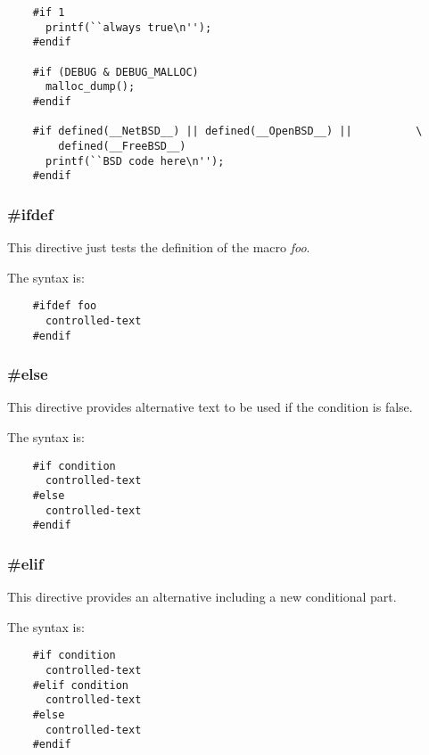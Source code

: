 {\begin{frame}[containsverbatim]
  \begin{verbatim}
    #if 1
      printf(``always true\n'');
    #endif

    #if (DEBUG & DEBUG_MALLOC)
      malloc_dump();
    #endif

    #if defined(__NetBSD__) || defined(__OpenBSD__) ||          \
        defined(__FreeBSD__)
      printf(``BSD code here\n'');
    #endif
  \end{verbatim}
\end{frame}


\begin{frame}[containsverbatim]
  \frametitle{\textbf{\#ifdef}}

  This directive just tests the definition of the macro \textit{foo}.

  \nl

  The syntax is:

  \begin{verbatim}
    #ifdef foo
      controlled-text
    #endif
  \end{verbatim}
\end{frame}


\begin{frame}[containsverbatim]
  \frametitle{\textbf{\#else}}

  This directive provides alternative text to be used if the condition
  is false.

  \nl

  The syntax is:

  \begin{verbatim}
    #if condition
      controlled-text
    #else
      controlled-text
    #endif
  \end{verbatim}
\end{frame}


\begin{frame}[containsverbatim]
  \frametitle{\textbf{\#elif}}

  This directive provides an alternative including a new conditional part.

  \nl

  The syntax is:

  \begin{verbatim}
    #if condition
      controlled-text
    #elif condition
      controlled-text
    #else
      controlled-text
    #endif
  \end{verbatim}
\end{frame}

}
